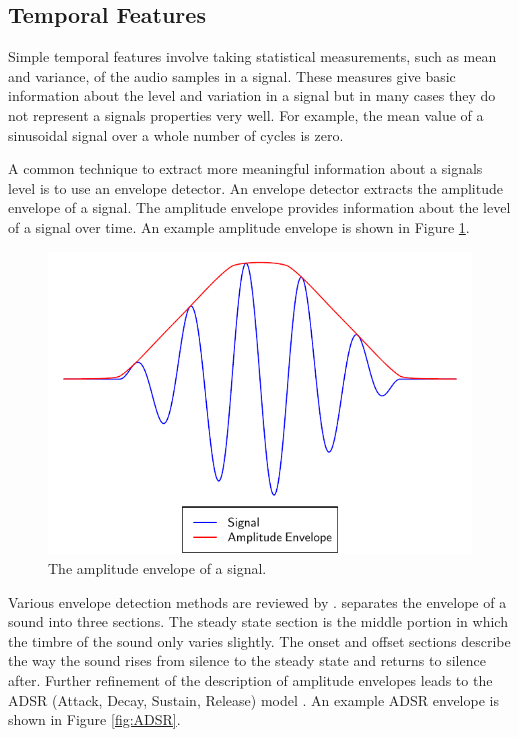 	\subsection{Temporal Features}
	\label{sec:Timbre-LowLevelFeatures-Temporal}
		Simple temporal features involve taking statistical measurements, such as mean and variance, of the audio
		samples in a signal. These measures give basic information about the level and variation in a signal but in
		many cases they do not represent a signals properties very well. For example, the mean value of a sinusoidal
		signal over a whole number of cycles is zero. 

		A common technique to extract more meaningful information about a signals level is to use an envelope
		detector. An envelope detector extracts the amplitude envelope of a signal. The amplitude envelope provides
		information about the level of a signal over time. An example amplitude envelope is shown in Figure
		\ref{fig:AmplitudeEnvelope}.

		\begin{figure}[h!]
			\centering
			\includegraphics{chapter2/Images/AmplitudeEnvelope.pdf}
			\caption{The amplitude envelope of a signal.}
			\label{fig:AmplitudeEnvelope}
		\end{figure}

		Various envelope detection methods are reviewed by \citet{chang2007a}. \citet{howard2009acoustics} separates
		the envelope of a sound into three sections. The steady state section is the middle portion in which the
		timbre of the sound only varies slightly. The onset and offset sections describe the way the sound rises
		from silence to the steady state and returns to silence after. Further refinement of the description of
		amplitude envelopes leads to the ADSR (Attack, Decay, Sustain, Release) model \citep{descrivan2012music}. An
		example ADSR envelope is shown in Figure \ref{fig:ADSR}.

